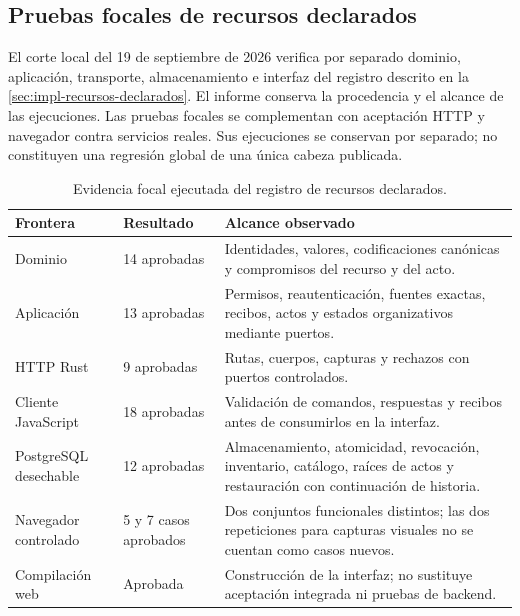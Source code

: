 \subsection{Pruebas focales de recursos declarados}\label{sec:pruebas-recursos-declarados}

El corte local del 19 de septiembre de 2026 verifica por separado dominio, aplicación, transporte, almacenamiento e interfaz del registro descrito en la \cref{sec:impl-recursos-declarados}. El informe  conserva la procedencia y el alcance de las ejecuciones. Las pruebas focales se complementan con aceptación HTTP y navegador contra servicios reales. Sus ejecuciones se conservan por separado; no constituyen una regresión global de una única cabeza publicada.

\begin{table}[H]
  \centering
  \caption{Evidencia focal ejecutada del registro de recursos declarados.}
  \label{tab:pruebas-recursos-declarados}
  \begin{tabularx}{\linewidth}{@{}L{2.9cm} L{2.7cm} X@{}}
    \toprule
    \textbf{Frontera} & \textbf{Resultado} & \textbf{Alcance observado} \\
    \midrule
    Dominio & 14 aprobadas & Identidades, valores, codificaciones canónicas y compromisos del recurso y del acto. \\
    Aplicación & 13 aprobadas & Permisos, reautenticación, fuentes exactas, recibos, actos y estados organizativos mediante puertos. \\
    HTTP Rust & 9 aprobadas & Rutas, cuerpos, capturas y rechazos con puertos controlados. \\
    Cliente JavaScript & 18 aprobadas & Validación de comandos, respuestas y recibos antes de consumirlos en la interfaz. \\
    PostgreSQL desechable & 12 aprobadas & Almacenamiento, atomicidad, revocación, inventario, catálogo, raíces de actos y restauración con continuación de historia. \\
    Navegador controlado & 5 y 7 casos aprobados & Dos conjuntos funcionales distintos; las dos repeticiones para capturas visuales no se cuentan como casos nuevos. \\
    Compilación web & Aprobada & Construcción de la interfaz; no sustituye aceptación integrada ni pruebas de backend. \\
    \bottomrule
  \end{tabularx}
\end{table}

